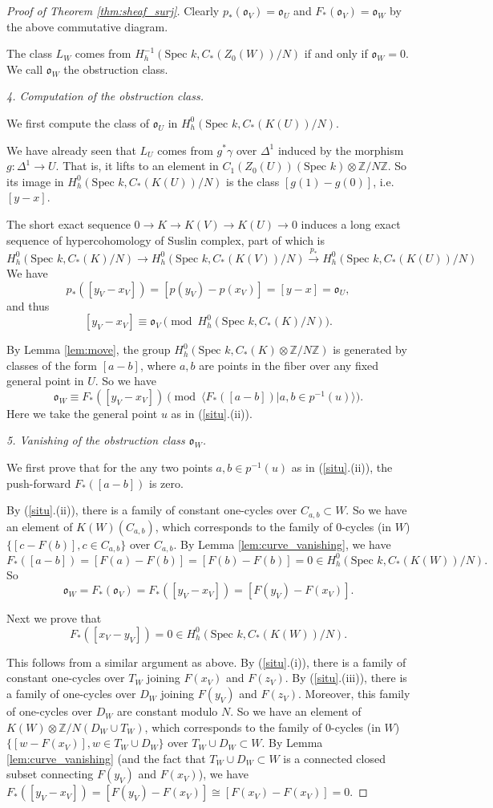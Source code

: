 \documentclass{amsart}
\theoremstyle{definition}
\theoremstyle{remark}
\newcommand{\mbb}{\mathbb}
\newcommand{\ZZ}{\mbb{Z}}
\newcommand{\SP}{\text{Spec }}
\begin{document}
\begin{proof}[Proof of Theorem \ref{thm:sheaf_surj}]
Clearly $p_*(\mathfrak{o}_V)=\mathfrak{o}_U$ and $F_*(\mathfrak{o}_V)=\mathfrak{o}_W$ by the above commutative diagram.

The class $L_W$ comes from $H^{-1}_h(\SP k, C_*(Z_0(W))/N)$ if and only if $\mathfrak{o}_W=0$. We call $\mathfrak{o}_W$ the obstruction class.

\textit{4. Computation of the obstruction class.}

We first compute the class of $\mathfrak{o}_U$ 
in $H^0_h(\SP k, C_*(K(U))/N)$.

We have already seen that $L_U$ comes from $g^*\gamma$ over $\Delta^1$ induced by the morphism $g: \Delta^1 \to U$. That is, it lifts to an element in $C_1(Z_0(U))(\SP k)\otimes\ZZ/N \ZZ$. 
So its image in $H^0_h(\SP k, C_*(K(U))/N)$ is the class $[g(1)-g(0)]$, i.e. $[y-x]$.


The short exact sequence 
$0 \to K \to K(V) \to K(U) \to 0$
induces a long exact sequence of hypercohomology of Suslin complex, part of which is
\[
H^0_h(\SP k, C_*(K)/N) \to H^0_h(\SP k, C_*(K(V))/N) \xrightarrow{p_*} H^0_h(\SP k, C_*(K(U))/N)
\]
We have $$p_*([y_V-x_V])=[p(y_V)-p(x_V)]=[y-x]=\mathfrak{o}_U,$$ and thus  
\[
[y_V-x_V]\equiv \mathfrak{o}_V \pmod{H^0_h(\SP k, C_*(K)/N)}.
\]

By Lemma \ref{lem:move}, the group $H^{0}_h(\SP k, C_*(K)\otimes \ZZ/N\ZZ)$ is generated by classes of the form $[a-b]$, where $a, b$ are points in the fiber over any fixed general point in $U$.
So we have
\[
\mathfrak{o}_W\equiv F_*([y_V-x_V]) \pmod{\langle F_*([a-b])| a, b \in p^{-1}(u)\rangle}.
\]
Here we take the general point $u$ as in (\ref{situ}.(ii)).

\textit{5. Vanishing of the obstruction class $\mathfrak{o}_W$.}

 We first prove that for the any two points $a, b \in p^{-1}(u)$ as in (\ref{situ}.(ii)), the push-forward $F_*([a-b])$ is zero. 
 
By (\ref{situ}.(ii)), there is a family of constant one-cycles over $C_{a, b}\subset W$. 
So we have an element of $K(W)(C_{a, b})$, which corresponds to the family of $0$-cycles (in $W$) $\{[c-F(b)], c \in C_{a, b}\}$ over $C_{a, b}$.  By Lemma \ref{lem:curve_vanishing}, we have
\[
F_*([a-b])=[F(a)-F(b)]= [F(b)-F(b)]=0 \in H^0 _h(\SP k, C_*(K(W))/N).
\]
So $$\mathfrak{o}_W=F_*(\mathfrak{o}_V)=F_*([y_V-x_V])=[F(y_V)-F(x_V)].$$

 Next we prove that $$F_*([x_V-y_V])=0 \in H^0_h(\SP k, C_*(K(W))/N).$$
 
 This follows from a similar argument as above. By (\ref{situ}.(i)), there is a family of constant one-cycles over $T_W$ joining $F(x_V)$ and $F(z_V)$.  
 By (\ref{situ}.(iii)), there is a family of one-cycles over $D_W$ joining $F(y_V)$ and $F(z_V)$. Moreover, this family of one-cycles over $D_W$ are constant modulo $N$.
So we have an element of $K(W)\otimes \ZZ/N (D_W \cup T_W)$, which corresponds to the family of $0$-cycles (in $W$) $\{[w-F(x_V)], w \in T_W\cup D_W\}$ over $T_W\cup D_W \subset W$. 
By Lemma \ref{lem:curve_vanishing} (and the fact that $T_W\cup D_W \subset W$ is a connected closed subset connecting $F(y_V)$ and $F(x_V)$), we have
$F_*([y_V-x_V])=[F(y_V)-F(x_V)]\cong [F(x_V)-F(x_V)]=0$.


\end{proof}
\end{document}
